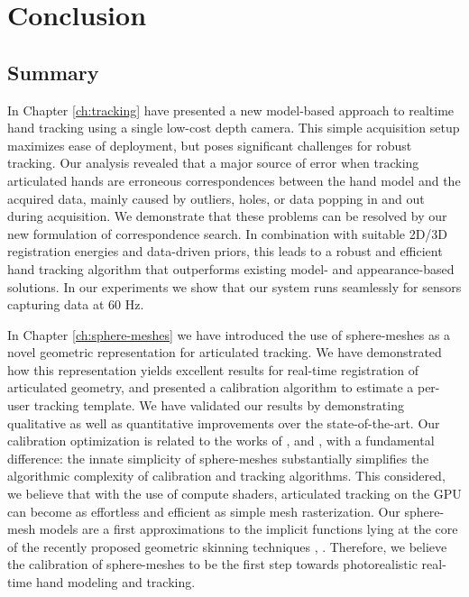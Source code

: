 \chapter{Conclusion}

\section{Summary}

In Chapter \ref{ch:tracking} have presented a new model-based approach to realtime hand tracking using a single low-cost depth camera. This simple acquisition setup maximizes ease of deployment, but poses significant challenges for robust tracking. 
Our analysis revealed that a major source of error when tracking articulated hands are erroneous correspondences between the hand model and the acquired data, mainly caused by outliers, holes, or data popping in and out during acquisition. 
We demonstrate that these problems can be resolved by our new formulation of correspondence search. In combination with suitable 2D/3D registration energies and data-driven priors, this leads to a robust and efficient hand tracking algorithm that outperforms existing model- and appearance-based solutions. In our experiments we show that our system runs seamlessly for sensors capturing data at 60 Hz. 

In Chapter \ref{ch:sphere-meshes} we have introduced the use of sphere-meshes as a novel geometric representation for articulated tracking. We have demonstrated how this representation yields excellent results for real-time registration of articulated geometry, and presented a calibration algorithm to estimate a per-user tracking template. We have validated our results by demonstrating qualitative as well as quantitative improvements over the state-of-the-art. Our calibration optimization is related to the works of \cite{taylor2014user},  \cite{khamis15learning} and  \cite{joseph2016fits}, with a fundamental difference: the innate simplicity of sphere-meshes substantially simplifies the algorithmic complexity of calibration and tracking algorithms. This considered, we believe that with the use of compute shaders, articulated tracking on the GPU can become as effortless and efficient as simple mesh rasterization. 
Our sphere-mesh models are a first approximations to the implicit functions lying at the core of the recently proposed geometric skinning techniques \cite{vaillant2013implicit},  \cite{vaillant2014robust}. Therefore, we believe the calibration of sphere-meshes to be the first step towards photorealistic real-time hand modeling and tracking.

